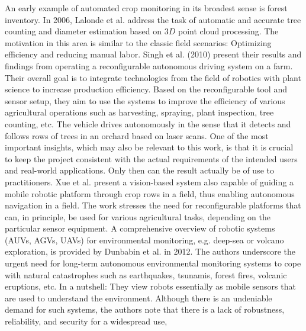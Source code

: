 \documentclass[english, master, utf8]{base/thesis_KBS}
\begin{document}
\noindent
An early example of automated crop monitoring in its broadest sense is forest inventory. In 2006, Lalonde et al. \cite{Lalonde:2006} address the task of automatic and accurate tree counting and
diameter estimation based on $3D$ point cloud processing. The motivation in this area is similar to the classic field scenarios: Optimizing efficiency and reducing manual labor.\newline
Singh et al. \cite{Singh:2010} (2010) present their results and findings from operating a reconfigurable autonomous driving system on a farm. Their overall goal is to integrate technologies
from the field of robotics with plant science to increase production efficiency. Based on the reconfigurable tool and sensor setup, they aim to use the systems to improve the
efficiency of various agricultural operations such as harvesting, spraying, plant inspection, tree counting, etc. The vehicle drives autonomously in the sense that it detects and
follows rows of trees in an orchard based on laser scans. One of the most important insights, which may also be relevant to this work, is that it is crucial to keep the project
consistent with the actual requirements of the intended users and real-world applications. Only then can the result actually be of use to practitioners.\newline
Xue et al. \cite{Xue:2010} present a vision-based system also capable of guiding a mobile robotic platform through crop rows in a field, thus enabling autonomous navigation
in a field. The work stresses the need for reconfigurable platforms that can, in principle, be used for various agricultural tasks, depending on the particular sensor equipment.
\newline
A comprehensive overview of robotic systems (AUVs, AGVs, UAVs) for environmental monitoring, e.g. deep-sea or volcano exploration, is provided by Dunbabin et al. \cite{Dunbabin:2012} in 2012.
The authors underscore the urgent need for long-term autonomous environmental monitoring systems to cope with natural catastrophes such as earthquakes, tsunamis, forest fires, volcanic
eruptions, etc. In a nutshell:  \cite{Dunbabin:2012} They view robots essentially as mobile sensors that are used to understand
the environment. Although there is an undeniable demand for such systems, the authors note that there is a lack of robustness, reliability, and security for a widespread use,
\end{document}
